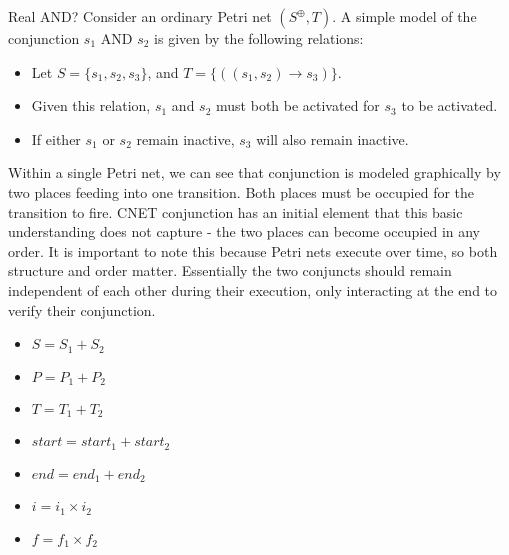 Real AND?
Consider an ordinary Petri net $(S^\oplus, T)$. A simple model of the conjunction $s_1$ AND $s_2$ is given by the following relations:
  \begin{itemize}
  \item Let $S = \{s_1, s_2, s_3\}$, and $T = \{((s_1, s_2) \to s_3)\}$. 
  \item Given this relation, $s_1$ and $s_2$ must both be activated for $s_3$ to be activated. 
  \item If either $s_1$ or $s_2$ remain inactive, $s_3$ will also remain inactive.  
  \end{itemize}

Within a single Petri net, we can see that conjunction is modeled graphically by two places feeding into one transition. Both places must be occupied for the transition to fire. CNET conjunction has an initial element that this basic understanding does not capture - the two places can become occupied in any order. It is important to note this because Petri nets execute over time, so both structure and order matter. Essentially the two conjuncts should remain independent of each other during their execution, only interacting at the end to verify their conjunction.
\begin{itemize}
\item $S = S_1 + S_2$
\item $P= P_1 + P_2$
\item $T = T_1 + T_2$
\item $start = start_1 + start_2$
\item $end = end_1 + end_2$
\item $i = i_1 \times i_2$
\item$f = f_1 \times f_2$
\end{itemize}

